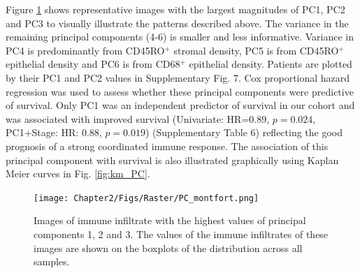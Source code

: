  
 
Figure \ref{fig:PC_examples} shows representative images with the largest magnitudes of PC1, PC2 and PC3 to visually illustrate the patterns described above. The variance in the remaining principal components (4-6) is smaller and less informative. Variance in PC4 is predominantly from CD45RO$^+$ stromal density, PC5 is from CD45RO$^+$ epithelial density and PC6 is from CD68$^+$ epithelial density. Patients are plotted by their PC1 and PC2 values in Supplementary Fig. 7.  Cox proportional hazard regression was used to assess whether these principal components were predictive of survival. Only PC1 was an independent predictor of survival in our cohort and was associated with improved survival (Univariate: HR=$0.89$, $p=0.024$, PC1+Stage: HR: $0.88$, $p=0.019$) (Supplementary Table 6) reflecting the good prognosis of a strong coordinated immune response. The association of this principal component with survival is also illustrated graphically using Kaplan Meier curves in Fig. \ref{fig:km_PC}.
\begin{landscape}
\begin{figure}[width=0.8\textwidth, keepaspectratio]
    \centering
    \texttt{[image: Chapter2/Figs/Raster/PC\_montfort.png]}
    \caption[Examples of tissue with largest values of principal components.]{Images of immune infiltrate with the highest values of principal components 1, 2 and 3. The values of the immune infiltrates of these images are shown on the boxplots of the distribution across all samples.}
    \label{fig:PC_examples}
\end{figure}
\end{landscape}

